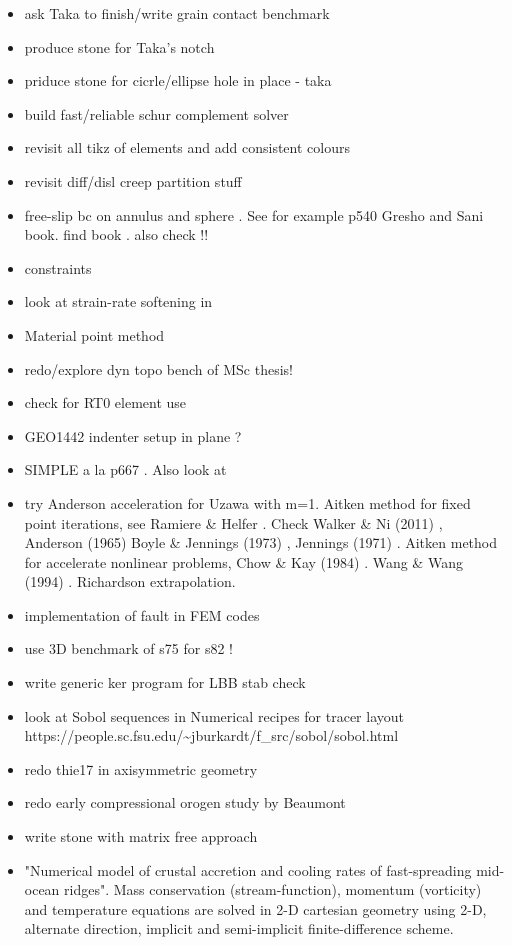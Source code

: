 \documentclass[a4paper]{article}
\begin{document}
\begin{itemize}
\item ask Taka to finish/write grain contact benchmark
\item produce stone for Taka's notch
\item priduce stone for cicrle/ellipse hole in place - taka
\item build fast/reliable schur complement solver
\item revisit all tikz of elements and add consistent colours
\item revisit diff/disl creep partition stuff
\item free-slip bc on annulus and sphere . See for example p540 Gresho and Sani book. find book \cite{deab72}.
also check \cite{ensg82} !!
\item constraints \cite{absh79}
\item look at strain-rate softening in \cite{belz02}
\item Material point method \cite{sucs94,susc96,susp07}
\item redo/explore dyn topo bench of \cite{bore19} MSc thesis!
\item check \cite{bufm19} for RT0 element use
\item GEO1442 indenter setup in plane ?
\item SIMPLE a la p667 \cite{john16}. Also look at \cite{vusb00} 
\item try Anderson acceleration for Uzawa \cite{hoow17} with m=1. Aitken method for 
fixed point iterations, see Ramiere \& Helfer \cite{rahe15}.
Check Walker \& Ni (2011) \cite{wani11}, Anderson (1965) \cite{ande65}
Boyle \& Jennings (1973) \cite{boje73}, Jennings (1971) \cite{jenn71}.
Aitken method for accelerate nonlinear problems, Chow \& Kay (1984) \cite{chka84}.
Wang \& Wang (1994) \cite{wawa94}. Richardson extrapolation. 
\item implementation of fault in FEM codes \cite{zhgu94,zhgu95}
\item use 3D benchmark of s75 for s82 !
\item write generic ker program for LBB stab check
\item look at Sobol sequences in Numerical recipes for tracer layout\\
https://people.sc.fsu.edu/\~{}jburkardt/f\_src/sobol/sobol.html
\item redo thie17 in axisymmetric geometry
\item redo early compressional orogen study by Beaumont \cite{bequ94}

\item write stone with matrix free approach

\item "Numerical model of crustal accretion and cooling rates of fast-spreading mid-ocean ridges". Mass conservation
(stream-function), momentum (vorticity) and temperature equations are solved in 2-D cartesian geometry 
using 2-D, alternate direction, implicit and semi-implicit finite-difference scheme.

\end{itemize}
\end{document}
